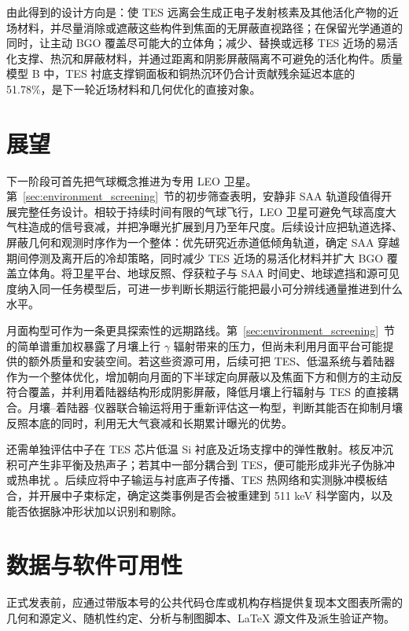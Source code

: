 \documentclass[11pt]{article}
\begin{document}
由此得到的设计方向是：使 TES 远离会生成正电子发射核素及其他活化产物的近场材料，并尽量消除或遮蔽这些构件到焦面的无屏蔽直视路径；在保留光学通道的同时，让主动 BGO 覆盖尽可能大的立体角；减少、替换或远移 TES 近场的易活化支撑、热沉和屏蔽材料，并通过距离和阴影屏蔽隔离不可避免的活化构件。质量模型 B 中，TES 衬底支撑铜面板和铜热沉环仍合计贡献残余延迟本底的 51.78\%，是下一轮近场材料和几何优化的直接对象。

\section{展望}
\label{sec:outlook}

下一阶段可首先把气球概念推进为专用 LEO 卫星。第~\ref{sec:environment_screening}~节的初步筛查表明，安静非 SAA 轨道段值得开展完整任务设计。相较于持续时间有限的气球飞行，LEO 卫星可避免气球高度大气柱造成的信号衰减，并把净曝光扩展到月乃至年尺度。后续设计应把轨道选择、屏蔽几何和观测时序作为一个整体：优先研究近赤道低倾角轨道，确定 SAA 穿越期间停测及离开后的冷却策略，同时减少 TES 近场的易活化材料并扩大 BGO 覆盖立体角。将卫星平台、地球反照、俘获粒子与 SAA 时间史、地球遮挡和源可见度纳入同一任务模型后，可进一步判断长期运行能把最小可分辨线通量推进到什么水平。

月面构型可作为一条更具探索性的远期路线。第~\ref{sec:environment_screening}~节的简单谱重加权暴露了月壤上行 $\gamma$ 辐射带来的压力，但尚未利用月面平台可能提供的额外质量和安装空间。若这些资源可用，后续可把 TES、低温系统与着陆器作为一个整体优化，增加朝向月面的下半球定向屏蔽以及焦面下方和侧方的主动反符合覆盖，并利用着陆器结构形成阴影屏蔽，降低月壤上行辐射与 TES 的直接耦合。月壤--着陆器--仪器联合输运将用于重新评估这一构型，判断其能否在抑制月壤反照本底的同时，利用无大气衰减和长期累计曝光的优势。

\newpage
\begin{samepage}
还需单独评估中子在 TES 芯片低温 Si 衬底及近场支撑中的弹性散射。核反冲沉积可产生非平衡及热声子；若其中一部分耦合到 TES，便可能形成非光子伪脉冲或热串扰 \cite{Agnese2018NuclearRecoil,Hull2023ThermalBackground}。后续应将中子输运与衬底声子传播、TES 热网络和实测脉冲模板结合，并开展中子束标定，确定这类事例是否会被重建到 511 keV 科学窗内，以及能否依据脉冲形状加以识别和剔除。
\end{samepage}

\section*{数据与软件可用性}
正式发表前，应通过带版本号的公共代码仓库或机构存档提供复现本文图表所需的几何和源定义、随机性约定、分析与制图脚本、LaTeX 源文件及派生验证产物。
\end{document}
